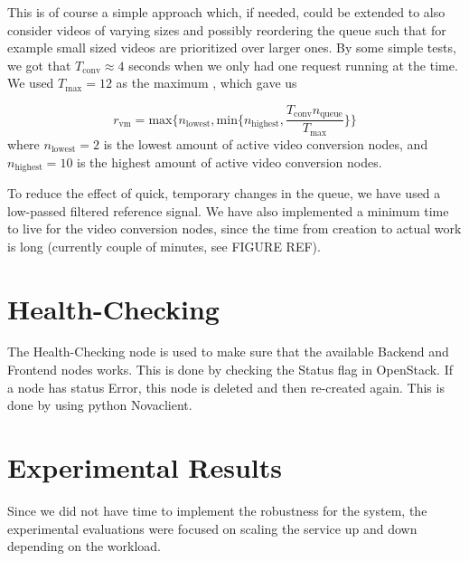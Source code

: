 \documentclass[a4paper, 10pt, english]{article}
\begin{document}
This is of course a simple approach which, if needed, could be extended to also consider videos of varying sizes and possibly reordering the queue such that for example small sized videos are prioritized over larger ones. By some simple tests, we got that $T_{\text{conv}} \approx 4$ seconds when we only had one request running at the time. We used $T_{\text{max}} = 12$ as the maximum , which gave us

\begin{equation*}
	r_{\text{vm}} = \text{max}\{n_{\text{lowest}}, \text{min}\{n_{\text{highest}}, \frac{T_{\text{conv}}  n_{\text{queue}}}{T_{\text{max}}}\} \}
\end{equation*} 
where $n_{\text{lowest}} = 2$ is the lowest amount of  active video conversion nodes, and $n_{\text{highest}} = 10$ is the highest amount of active video conversion nodes. 

To reduce the effect of quick, temporary  changes in the queue, we have used a low-passed filtered reference signal. We have also implemented a minimum time to live for the video conversion nodes, since the time from creation to actual work is long (currently couple of minutes, see FIGURE REF).

\section{Health-Checking} \label{sec:HC}
The Health-Checking node is used to make sure that the available Backend and Frontend nodes works. This is done by checking the Status flag in OpenStack. If a node has status Error, this node is deleted and then re-created again. This is done by using python Novaclient.


\section{Experimental Results}
Since we did not have time to implement the robustness for the system, the experimental evaluations were focused on scaling the service up and down depending on the workload. 
\end{document}

